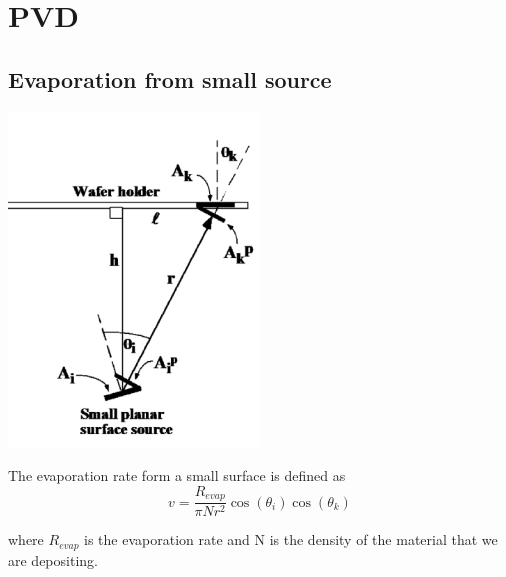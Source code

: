 
\section{PVD}

\subsection{Evaporation from small source}

\centering
\includegraphics[width=0.5\textwidth]{CVD_evap.png}\\
\raggedright


The evaporation rate form a small surface is defined as 
\begin{equation}
v=\frac{R_{evap}}{\pi N r^2}\cos(\theta_i )\cos(\theta_k)
\end{equation}

where $R_{evap}$ is the evaporation rate and N is the density of the material that we are depositing.\\


























